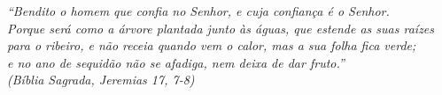\begin{epigrafe}
    \vspace*{\fill}
	\begin{flushright}
		\textit{``Bendito o homem que confia no Senhor, e cuja confiança é o Senhor.\\
		Porque será como a árvore plantada junto às águas, que estende as suas raízes \\
		para o ribeiro, e não receia quando vem o calor, mas a sua folha fica verde; \\
		e no ano de sequidão não se afadiga, nem deixa de dar fruto.''\\
		(Bíblia Sagrada, Jeremias 17, 7-8)}
	\end{flushright}
\end{epigrafe}
